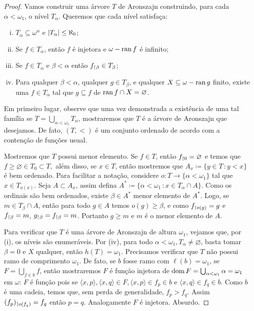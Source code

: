 \documentclass[a4paper]{article}
\begin{document}
\begin{proof}
  Vamos construir uma árvore \(T\) de Aronszajn construindo, para cada
  \(\alpha<\omega_1\), o nível \(T_\alpha\). Queremos que cada nível satisfaça:
  \begin{enumerate}[(i)]
    \item \(T_{\alpha} \subseteq \omega^{\alpha}\) e \(\vert T_{\alpha} \vert \le \aleph_0\);
    \item Se \(f \in T_{\alpha}\), então \(f\) é injetora e \(\omega - \operatorname{ran} f\) é infinito;
    \item Se \(f \in T_{\alpha}\) e \(\beta < \alpha\) então \(f_{\upharpoonright \beta} \in T_{\beta}\);
    \item Para qualquer \(\beta < \alpha\), qualquer \(g \in T_{\beta}\), e
    qualquer \(X \subseteq \omega - \operatorname{ran} g\) finito, existe uma \(f \in
    T_{\alpha}\) tal que \(g \subseteq f\) de \(\operatorname{ran} f \cap X = \varnothing\).
    \end{enumerate}

    Em primeiro lugar, observe que uma vez demonstrada a existência de uma tal
    família se \(T=\bigcup_{\alpha<\omega_1} T_\alpha\), mostraremos que \(T\) é
    a árvore  de Aronszajn que desejamos. De fato, \((T,<)\) é um conjunto
    ordenado de acordo com a contenção de funções usual.
    
    Mostremos que \(T\) possui menor elemento. Se \(f\in T\), então
    \(f_{\upharpoonright 0}=\varnothing\) e temos que \(f\geq\varnothing\in T_0\subset
    T,\) além disso,  se \(x\in T\), então mostremos que \(A_x\coloneqq\{y\in
    T\,\colon y<x\}\) é bem ordenado. Para facilitar a notação, considere
    \(o\colon T\rightarrow \{\alpha<\omega_1\}\) tal que \(x\in T_{o(x)}\). Seja
    \(A\subset A_x\), assim defina \(A^\ast\coloneqq \{\alpha<\omega_1\,\colon
    x\in T_\alpha\cap A\}\). 
    Como os ordinais são bem ordenados, existe \(\beta\in A^\ast\) menor
    elemento de \(A^\ast\).
    Logo, se \(m\in T_\beta\cap A\), então para todo \(g\in A\) temos
    \(o(g)\geq\beta\),  e como \(f_{\upharpoonright o(g)}=g\) e \(f_{\upharpoonright \beta}=m\),
    \(g_{\upharpoonright \beta}=f_{\upharpoonright \beta}=m\). Portanto \(g\geq m\) e \(m\) é o
    menor elemento de \(A\).
    
    Para verificar que \(T\) é uma árvore de Aronszajn de altura \(\omega_1\),
    vejamos que, por (i), os níveis são enumeráveis. Por (iv), para todo
    \(\alpha<\omega_1, T_\alpha\neq\varnothing\), basta tomar \(\beta=0\) e
    \(X\) qualquer,  então \(h(T)=\omega_1\). Precisamos verificar que \(T\) não
    possui ramo de comprimento \(\omega_1\). De fato, se \(b\) fosse ramo com
    \(\ell(b)=\omega_1\), se \(F=\bigcup_{f\in b} f\), então mostraremos \(F\) é
    função injetora de \(\operatorname{dom} F=\bigcup_{\alpha<\omega_1}\alpha=\omega_1\) em
    \(\omega\):  \(F\) é função pois se \(\langle x,p\rangle,\langle
    x,q\rangle\in F,  \langle x,p\rangle\in f_p\in b\) e \(\langle x,q\rangle\in
    f_q\in b\). Como \(b\) é uma cadeia, temos que, sem perda de generalidade,
    \(f_p>f_q\). Assim \((f_p)_{\upharpoonright o(f_q)}=f_q\) então \(p=q\). Analogamente
    \(F\) é injetora. Absurdo.
    

\end{proof}
\end{document}
